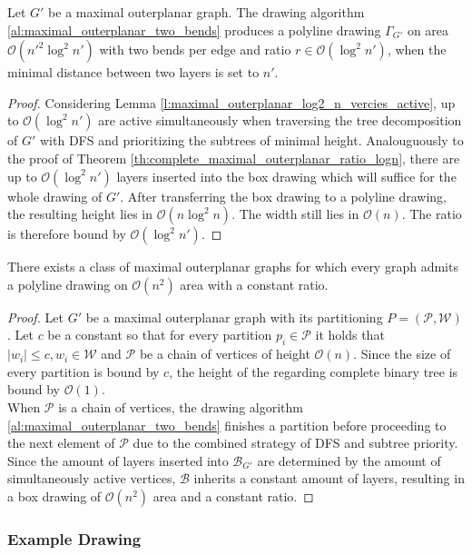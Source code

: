 \begin{theorem}
	Let $G'$ be a maximal outerplanar graph. The drawing algorithm \ref{al:maximal_outerplanar_two_bends} produces a polyline drawing $\Gamma_{G'}$ on area $\mathcal{O}(n'^2 \log^2 n')$ with two bends per edge and ratio $r \in \mathcal{O}(\log^2 n')$, when the minimal distance between two layers is set to $n'$.\label{th:maximal_outerplanar_log2_n_ratio}
\end{theorem}
\begin{proof}
	Considering Lemma \ref{l:maximal_outerplanar_log2_n_vercies_active}, up to $\mathcal{O}(\log^2 n')$ are active simultaneously when traversing the tree decomposition of $G'$ with DFS and prioritizing the subtrees of minimal height. Analouguously to the proof of Theorem \ref{th:complete_maximal_outerplanar_ratio_logn}, there are up to $\mathcal{O}(\log^2 n')$ layers inserted into the box drawing which will suffice for the whole drawing of $G'$. After transferring the box drawing to a polyline drawing, the resulting height lies in $\mathcal{O}(n\log^2 n)$. The width still lies in $\mathcal{O}(n)$. The ratio is therefore bound by $\mathcal{O}
	(\log^2 n')$. 
\end{proof}

\begin{theorem}
	There exists a class of maximal outerplanar graphs for which every graph admits a polyline drawing on $\mathcal{O}(n^2)$ area with a constant ratio.
\end{theorem}
\begin{proof}
	Let $G'$ be a maximal outerplanar graph with its partitioning $P = (\mathcal{P},\mathcal{W})$. Let $c$ be a constant so that for every partition $p_i \in \mathcal{P}$ it holds that $|w_i|\leq c, w_i \in \mathcal{W}$ and $\mathcal{P}$ be a chain of vertices of height $\mathcal{O}(n)$. Since the size of every partition is bound by $c$, the height of the regarding complete binary tree is bound by $\mathcal{O}(1)$.\\
	When $\mathcal{P}$ is a chain of vertices, the drawing algorithm \ref{al:maximal_outerplanar_two_bends} finishes a partition before proceeding to the next element of $\mathcal{P}$ due to the combined strategy of DFS and subtree priority. Since the amount of layers inserted into $\mathcal{B}_{G'}$ are determined by the amount of simultaneously active vertices, $\mathcal{B}$ inherits a constant amount of layers, resulting in a box drawing of $\mathcal{O}(n^2)$ area and a constant ratio.
\end{proof}
\newpage
\subsubsection{Example Drawing}

